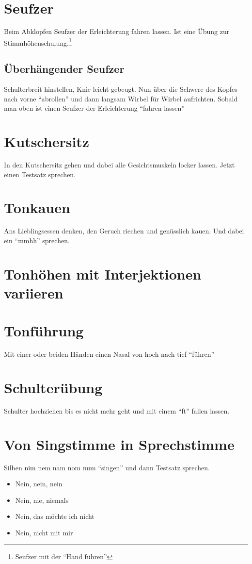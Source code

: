 \documentclass[ngerman, a4paper, twoside]{scrbook}%
\begin{document}
	 \section{Seufzer}
	 Beim Abklopfen Seufzer der Erleichterung fahren lassen. Ist eine Übung zur Stimmhöhenschulung.\footnote{Seufzer mit der "`Hand führen"'}
	 \subsection{Überhängender Seufzer}
	Schulterbreit hinstellen, Knie leicht gebeugt. Nun über die Schwere des Kopfes nach vorne "`abrollen"' und dann langsam Wirbel für Wirbel aufrichten. Sobald man oben ist einen Seufzer der Erleichterung "`fahren lassen"'
	\section{Kutschersitz}
	In den Kutschersitz gehen und dabei alle Gesichtsmuskeln locker lassen. Jetzt einen Testsatz sprechen.
	\section{Tonkauen}
	Ans Lieblingsessen denken, den Geruch riechen und genüsslich kauen. Und dabei ein "`mmhh"' sprechen.
	\section{Tonhöhen mit Interjektionen variieren}
	\section{Tonführung}
	Mit einer oder beiden Händen einen Nasal von hoch nach tief "`führen"'
	\section{Schulterübung}
	Schulter hochziehen bis es nicht mehr geht und mit einem "`ft"' fallen lassen.
	\section{Von Singstimme in Sprechstimme}
	Silben nim nem nam nom num "`singen"' und dann Testsatz sprechen.
	\begin{itemize}
		\item Nein, nein, nein
		\item Nein, nie, niemals
		\item Nein, das möchte ich nicht
		\item Nein, nicht mit mir
	\end{itemize}
\end{document}
